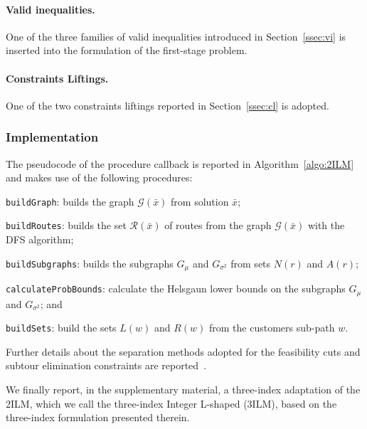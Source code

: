 \documentclass[11pt]{article}
\theoremstyle{definition}
\begin{document}
\paragraph{Valid inequalities.}
One of the three families of valid inequalities introduced in Section~\ref{ssec:vi} is inserted into the formulation of the first-stage problem.

\paragraph{Constraints Liftings.}
One of the two constraints liftings reported in Section~\ref{ssec:cl} is adopted.

\subsubsection{Implementation}
The pseudocode of the procedure callback is reported in Algorithm~\ref{algo:2ILM} and makes use of the following procedures:
%
\begin{inparaenum}[(i)]
  \item \texttt{buildGraph}: builds the graph $\mathcal{G}(\bar{x})$ from solution $\bar{x}$;
	\item \texttt{buildRoutes}: builds the set $\mathcal{R}(\bar{x})$ of routes from the graph $\mathcal{G}(\bar{x})$ with the DFS algorithm;
	\item \texttt{buildSubgraphs}: builds the subgraphs $G_{\mu}$ and $G_{\sigma^2}$ from sets $N(r)$ and $A(r)$;
	\item \texttt{calculateProbBounds}: calculate the Helsgaun lower bounds on the subgraphs $G_{\mu}$ and $G_{\sigma^2}$; and
	\item \texttt{buildSets}: build the sets $L(w)$ and $R(w)$ from the customers sub-path $w$.
\end{inparaenum}

\bigskip
%
\noindent
Further details about the separation methods adopted for the feasibility cuts and subtour elimination constraints are reported~\cite{Guastalla2025}.

We finally report, in the supplementary material, a three-index adaptation of the 2ILM, which we call the three-index Integer L-shaped (3ILM), based on the three-index formulation presented therein.

\end{document}
